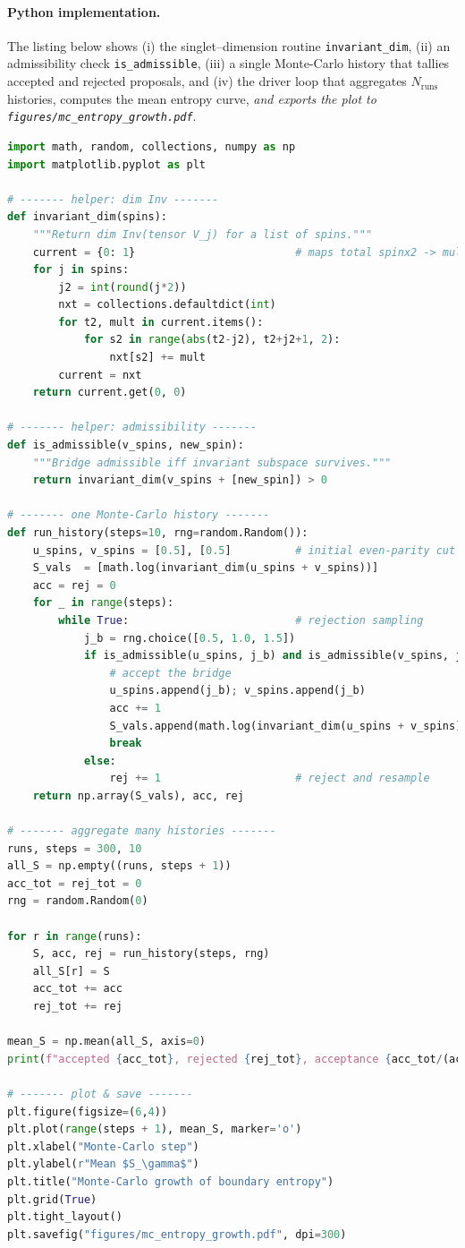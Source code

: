 \documentclass[11pt]{article}
\begin{document}
\paragraph{Python implementation.}
The listing below shows (i) the singlet–dimension routine
\texttt{invariant\_dim}, (ii) an admissibility check
\texttt{is\_admissible}, (iii) a single Monte-Carlo history that tallies
accepted and rejected proposals, and (iv) the driver loop that aggregates
$N_{\text{runs}}$ histories, computes the mean entropy curve, \emph{and
exports the plot to
\texttt{figures/mc\_entropy\_growth.pdf}}.

\begin{lstlisting}[language=Python,caption={Monte-Carlo entropy scan with admissibility filtering}]
import math, random, collections, numpy as np
import matplotlib.pyplot as plt

# ------- helper: dim Inv -------
def invariant_dim(spins):
    """Return dim Inv(tensor V_j) for a list of spins."""
    current = {0: 1}                         # maps total spinx2 -> mult
    for j in spins:
        j2 = int(round(j*2))
        nxt = collections.defaultdict(int)
        for t2, mult in current.items():
            for s2 in range(abs(t2-j2), t2+j2+1, 2):
                nxt[s2] += mult
        current = nxt
    return current.get(0, 0)

# ------- helper: admissibility -------
def is_admissible(v_spins, new_spin):
    """Bridge admissible iff invariant subspace survives."""
    return invariant_dim(v_spins + [new_spin]) > 0

# ------- one Monte-Carlo history -------
def run_history(steps=10, rng=random.Random()):
    u_spins, v_spins = [0.5], [0.5]          # initial even-parity cut
    S_vals  = [math.log(invariant_dim(u_spins + v_spins))]
    acc = rej = 0
    for _ in range(steps):
        while True:                          # rejection sampling
            j_b = rng.choice([0.5, 1.0, 1.5])
            if is_admissible(u_spins, j_b) and is_admissible(v_spins, j_b):
                # accept the bridge
                u_spins.append(j_b); v_spins.append(j_b)
                acc += 1
                S_vals.append(math.log(invariant_dim(u_spins + v_spins)))
                break
            else:
                rej += 1                     # reject and resample
    return np.array(S_vals), acc, rej

# ------- aggregate many histories -------
runs, steps = 300, 10
all_S = np.empty((runs, steps + 1))
acc_tot = rej_tot = 0
rng = random.Random(0)

for r in range(runs):
    S, acc, rej = run_history(steps, rng)
    all_S[r] = S
    acc_tot += acc
    rej_tot += rej

mean_S = np.mean(all_S, axis=0)
print(f"accepted {acc_tot}, rejected {rej_tot}, acceptance {acc_tot/(acc_tot+rej_tot):.3f}")

# ------- plot & save -------
plt.figure(figsize=(6,4))
plt.plot(range(steps + 1), mean_S, marker='o')
plt.xlabel("Monte-Carlo step")
plt.ylabel(r"Mean $S_\gamma$")
plt.title("Monte-Carlo growth of boundary entropy")
plt.grid(True)
plt.tight_layout()
plt.savefig("figures/mc_entropy_growth.pdf", dpi=300)
\end{lstlisting}
\end{document}
